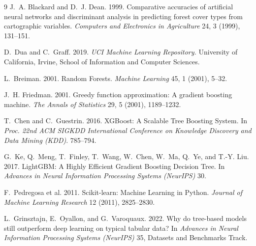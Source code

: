 \documentclass[sigconf,nonacm]{acmart}
\begin{document}
\begin{thebibliography}{9}
J.~A. Blackard and D.~J. Dean. 1999.
Comparative accuracies of artificial neural networks and discriminant analysis
in predicting forest cover types from cartographic variables.
\emph{Computers and Electronics in Agriculture} 24, 3 (1999), 131--151.

D.~Dua and C.~Graff. 2019.
\emph{UCI Machine Learning Repository.} University of California, Irvine,
School of Information and Computer Sciences.

L.~Breiman. 2001. Random Forests. \emph{Machine Learning} 45, 1 (2001), 5--32.

J.~H. Friedman. 2001. Greedy function approximation: A gradient boosting machine.
\emph{The Annals of Statistics} 29, 5 (2001), 1189--1232.

T.~Chen and C.~Guestrin. 2016. XGBoost: A Scalable Tree Boosting System. In
\emph{Proc. 22nd ACM SIGKDD International Conference on Knowledge Discovery and
Data Mining (KDD)}. 785--794.

G.~Ke, Q.~Meng, T.~Finley, T.~Wang, W.~Chen, W.~Ma, Q.~Ye, and T.-Y. Liu. 2017.
LightGBM: A Highly Efficient Gradient Boosting Decision Tree. In
\emph{Advances in Neural Information Processing Systems (NeurIPS)} 30.

F.~Pedregosa et al. 2011. Scikit-learn: Machine Learning in Python.
\emph{Journal of Machine Learning Research} 12 (2011), 2825--2830.

L.~Grinsztajn, E.~Oyallon, and G.~Varoquaux. 2022. Why do tree-based models still
outperform deep learning on typical tabular data? In
\emph{Advances in Neural Information Processing Systems (NeurIPS)} 35, Datasets
and Benchmarks Track.
\end{thebibliography}
\end{document}
